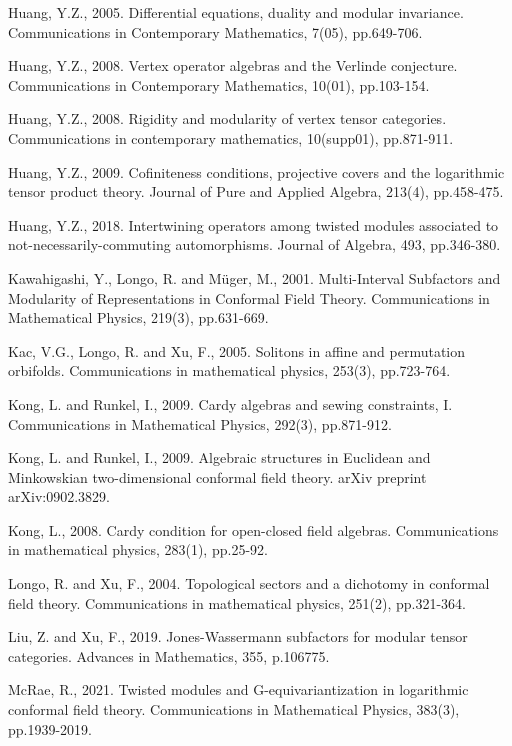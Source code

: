 \documentclass[12pt,a4paper,notitlepage]{article}
\theoremstyle{definition}
\theoremstyle{plain}
\numberwithin{equation}{subsection}
\begin{document}
\begin{thebibliography}{999999}
Huang, Y.Z., 2005. Differential equations, duality and modular invariance. Communications in Contemporary Mathematics, 7(05), pp.649-706.


Huang, Y.Z., 2008. Vertex operator algebras and the Verlinde conjecture. Communications in Contemporary Mathematics, 10(01), pp.103-154.

Huang, Y.Z., 2008. Rigidity and modularity of vertex tensor categories. Communications in contemporary mathematics, 10(supp01), pp.871-911.

Huang, Y.Z., 2009. Cofiniteness conditions, projective covers and the logarithmic tensor product theory. Journal of Pure and Applied Algebra, 213(4), pp.458-475.



Huang, Y.Z., 2018. Intertwining operators among twisted modules associated to not-necessarily-commuting automorphisms. Journal of Algebra, 493, pp.346-380.

Kawahigashi, Y., Longo, R. and Müger, M., 2001. Multi-Interval Subfactors and Modularity of Representations in Conformal Field Theory. Communications in Mathematical Physics, 219(3), pp.631-669.

Kac, V.G., Longo, R. and Xu, F., 2005. Solitons in affine and permutation orbifolds. Communications in mathematical physics, 253(3), pp.723-764.

Kong, L. and Runkel, I., 2009. Cardy algebras and sewing constraints, I. Communications in Mathematical Physics, 292(3), pp.871-912.

Kong, L. and Runkel, I., 2009. Algebraic structures in Euclidean and Minkowskian two-dimensional conformal field theory. arXiv preprint arXiv:0902.3829.


Kong, L., 2008. Cardy condition for open-closed field algebras. Communications in mathematical physics, 283(1), pp.25-92.


Longo, R. and Xu, F., 2004. Topological sectors and a dichotomy in conformal field theory. Communications in mathematical physics, 251(2), pp.321-364.	

Liu, Z. and Xu, F., 2019. Jones-Wassermann subfactors for modular tensor categories. Advances in Mathematics, 355, p.106775.	


McRae, R., 2021. Twisted modules and G-equivariantization in logarithmic conformal field theory. Communications in Mathematical Physics, 383(3), pp.1939-2019.


\end{thebibliography}
\end{document}

